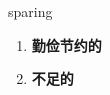 
\begin{frame}
{\huge sparing}
\begin{center}
\begin{enumerate}\Large
  \item \textbf{勤俭节约的}
  \item \textbf{不足的}
\end{enumerate}
\end{center}
\end{frame}
